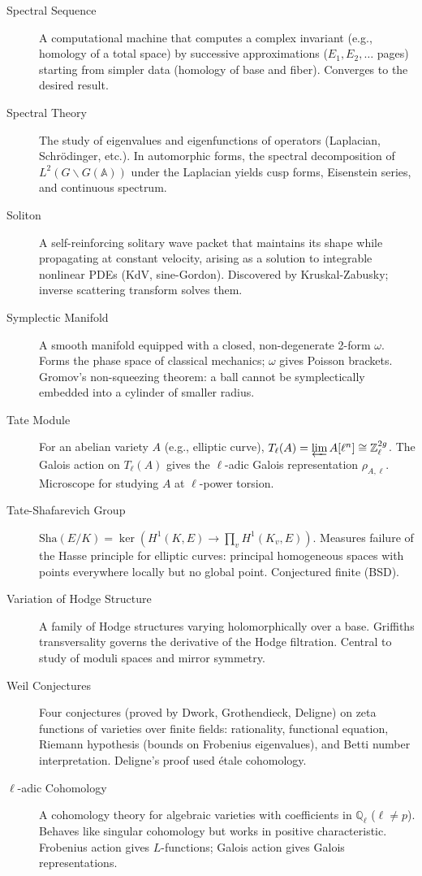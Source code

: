 \begin{description}
    \item[Spectral Sequence] A computational machine that computes a complex invariant (e.g., homology of a total space) by successive approximations ($E_1, E_2, \dots$ pages) starting from simpler data (homology of base and fiber). Converges to the desired result.

    \item[Spectral Theory] The study of eigenvalues and eigenfunctions of operators (Laplacian, Schrödinger, etc.). In automorphic forms, the spectral decomposition of $L^2(G\backslash G(\mathbb{A}))$ under the Laplacian yields cusp forms, Eisenstein series, and continuous spectrum.

    \item[Soliton] A self-reinforcing solitary wave packet that maintains its shape while propagating at constant velocity, arising as a solution to integrable nonlinear PDEs (KdV, sine-Gordon). Discovered by Kruskal-Zabusky; inverse scattering transform solves them.

    \item[Symplectic Manifold] A smooth manifold equipped with a closed, non-degenerate 2-form $\omega$. Forms the phase space of classical mechanics; $\omega$ gives Poisson brackets. Gromov's non-squeezing theorem: a ball cannot be symplectically embedded into a cylinder of smaller radius.

    \item[Tate Module] For an abelian variety $A$ (e.g., elliptic curve), $T_\ell(A) = \varprojlim A[\ell^n] \cong \mathbb{Z}_\ell^{2g}$. The Galois action on $T_\ell(A)$ gives the $\ell$-adic Galois representation $\rho_{A,\ell}$. Microscope for studying $A$ at $\ell$-power torsion.

    \item[Tate-Shafarevich Group] $\mathrm{Sha}(E/K) = \ker(H^1(K,E) \to \prod_v H^1(K_v,E))$. Measures failure of the Hasse principle for elliptic curves: principal homogeneous spaces with points everywhere locally but no global point. Conjectured finite (BSD).

    \item[Variation of Hodge Structure] A family of Hodge structures varying holomorphically over a base. Griffiths transversality governs the derivative of the Hodge filtration. Central to study of moduli spaces and mirror symmetry.

    \item[Weil Conjectures] Four conjectures (proved by Dwork, Grothendieck, Deligne) on zeta functions of varieties over finite fields: rationality, functional equation, Riemann hypothesis (bounds on Frobenius eigenvalues), and Betti number interpretation. Deligne's proof used étale cohomology.

    \item[$\ell$-adic Cohomology] A cohomology theory for algebraic varieties with coefficients in $\mathbb{Q}_\ell$ ($\ell \neq p$). Behaves like singular cohomology but works in positive characteristic. Frobenius action gives $L$-functions; Galois action gives Galois representations.
\end{description}